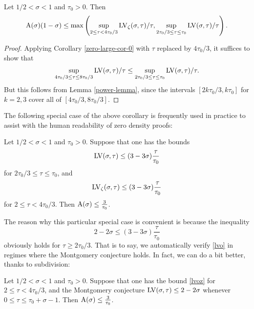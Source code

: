\begin{corollary}\label{zero-large-cor} Let $1/2 < \sigma < 1$ and $\tau_0 > 0$.  Then
$$ \mathrm{A}(\sigma)(1-\sigma) \leq \max \left(\sup_{2 \leq \tau < 4\tau_0/3} \mathrm{LV}_\zeta(\sigma,\tau)/\tau, \sup_{2\tau_0/3 \leq \tau \leq \tau_0} \mathrm{LV}(\sigma,\tau)/\tau\right).$$
\end{corollary}

\begin{proof}  Applying Corollary \ref{zero-large-cor-0} with $\tau$ replaced by $4\tau_0/3$, it suffices to show that
$$\sup_{4\tau_0/3 \leq \tau \leq 8\tau_0/3} \mathrm{LV}(\sigma,\tau)/\tau \leq \sup_{2\tau_0/3 \leq \tau \leq \tau_0} \mathrm{LV}(\sigma,\tau)/\tau.$$
But this follows from Lemma \ref{power-lemma}, since the intervals $[2k\tau_0/3, k\tau_0]$ for $k=2,3$ cover all of $[4\tau_0/3,8\tau_0/3]$.
\end{proof}

The following special case of the above corollary is frequently used in practice to assist with the human readability of zero density proofs:

\begin{corollary}\label{zero-large-cor2} Let $1/2 < \sigma < 1$ and $\tau_0 > 0$.  Suppose that one has the bounds
\begin{equation}\label{lvo}
\mathrm{LV}(\sigma,\tau) \leq (3-3\sigma) \frac{\tau}{\tau_0}
\end{equation}
for $2\tau_0/3 \leq \tau \leq \tau_0$, and
\begin{equation}\label{lvoz}
 \mathrm{LV}_\zeta(\sigma,\tau) \leq (3-3\sigma) \frac{\tau}{\tau_0}
\end{equation}
for $2 \leq \tau < 4\tau_0/3$.  Then $\mathrm{A}(\sigma) \leq \frac{3}{\tau_0}$.
\end{corollary}

The reason why this particular special case is convenient is because the inequality
\begin{equation}\label{obvious}
    2 - 2\sigma \leq (3-3\sigma) \frac{\tau}{\tau_0}
\end{equation}
obviously holds for $\tau \geq 2\tau_0/3$.  That is to say, we automatically verify \eqref{lvo} in regimes where the Montgomery conjecture holds. In fact, we can do a bit better, thanks to subdivision:

\begin{corollary}\label{zero-large-cor3} Let $1/2 < \sigma < 1$ and $\tau_0 > 0$. Suppose that one has the bound \eqref{lvoz}
   for $2 \leq \tau < 4\tau_0/3$, and the Montgomery conjecture $\mathrm{LV}(\sigma,\tau) \leq 2-2\sigma$ whenever $0 \leq \tau \leq \tau_0+\sigma-1$.  Then $\mathrm{A}(\sigma) \leq \frac{3}{\tau_0}$.
\end{corollary}

